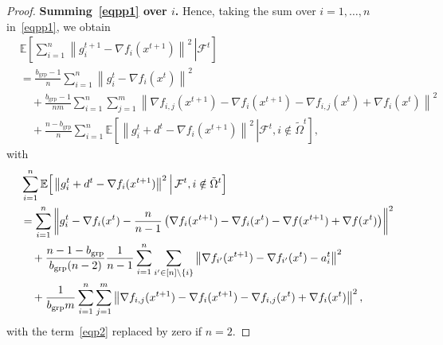 \documentclass{article}
\newcommand{\sqn}[1]{\left\| #1 \right\|^2}
\newcommand{\Expb}[2]{\mathbb{E}\!\left[\left. #1\,\right|#2 \right]}
\newcommand{\Expc}[1]{\Expb{#1}{\mathcal{F}^t}}
\theoremstyle{plain}
\begin{document}
\begin{proof}
\textbf{Summing~\eqref{eqpp1} over $i$.}
Hence, taking the sum over $i=1,\ldots,n$ in~\eqref{eqpp1}, we obtain
\begin{align*}
&\Expc{\sum_{i=1}^n \sqn{g_i^{t+1}-\nabla f_i(x^{t+1})}}\\
&=\frac{b_{\mathrm{grp}}-1}{n} \sum_{i=1}^n\sqn{g_i^t - \nabla f_i(x^{t})}\\
&\quad+\frac{b_{\mathrm{grp}}-1}{nm}\sum_{i=1}^n\sum_{j=1}^m
\sqn{\nabla f_{i,j}(x^{t+1})-\nabla f_i(x^{t+1})-\nabla f_{i,j}(x^{t})+\nabla f_i(x^{t})}\\
&\quad+\frac{n-b_{\mathrm{grp}}}{n}\sum_{i=1}^n \Expb{\sqn{g_i^{t}+d^t-\nabla f_i(x^{t+1})}}{\mathcal{F}^t, i\notin\tilde{\Omega}^t},
\end{align*}
with
\begin{align}
&\sum_{i=1}^n\Expb{\sqn{g_i^{t}+d^t-\nabla f_i(x^{t+1})}}{\mathcal{F}^t, i\notin\tilde{\Omega}^t}\notag\\
&=\sum_{i=1}^n\left\| g_i^{t}-\nabla f_i(x^{t})- \frac{n}{n-1}\left(\nabla f_{i}(x^{t+1})-\nabla f_{i}(x^{t})-\nabla f(x^{t+1})+\nabla f(x^{t}) \right) \right\|^2\notag\\
&\quad+\frac{n-1-b_{\mathrm{grp}}}{b_{\mathrm{grp}}(n-2)}\frac{1}{n-1}\sum_{i=1}^n\sum_{i'\in [n]\backslash\{i\}}
\sqn{\nabla f_{i'}(x^{t+1})-\nabla f_{i'}(x^{t})-a_i^t}\label{eqp2}\\
&\quad+\frac{1}{b_{\mathrm{grp}}m}\sum_{i=1}^n\sum_{j=1}^m
\sqn{\nabla f_{i,j}(x^{t+1})- \nabla f_{i}(x^{t+1})-\nabla f_{i,j}(x^{t})+\nabla f_{i}(x^{t})},\notag
\end{align}
with the term~\eqref{eqp2} replaced by zero if $n=2$.


\end{proof}
\end{document}
